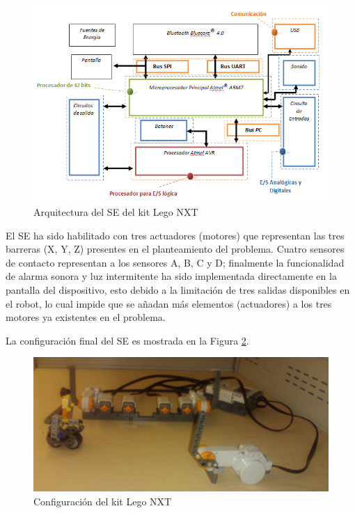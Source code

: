 \documentclass[journal]{IEEEtran}
\begin{document}
\begin{figure}[!t]
\centering
\includegraphics[width=\columnwidth]{diagramas/arquitectura-lego}
\caption{Arquitectura del SE del kit Lego NXT}
\label{fig:arquitectura-se-lego}
\end{figure}

El SE ha sido habilitado con tres actuadores (motores) que representan las tres barreras (X, Y, Z) presentes en el planteamiento del problema.
Cuatro sensores de contacto representan a los sensores A, B, C y D; finalmente la funcionalidad de alarma sonora y luz intermitente ha sido implementada directamente en la pantalla del dispositivo, esto debido a la limitación de tres salidas disponibles en el robot, lo cual impide que se añadan más elementos (actuadores) a los tres motores ya existentes en el problema.



La configuración final del SE es mostrada en la Figura \ref{fig:configuracion-lego}.

\begin{figure}[!t]
\centering
\includegraphics[width=\columnwidth]{diagramas/configuracion-lego}
\caption{Configuración del kit Lego NXT}
\label{fig:configuracion-lego}
\end{figure}
\end{document}

